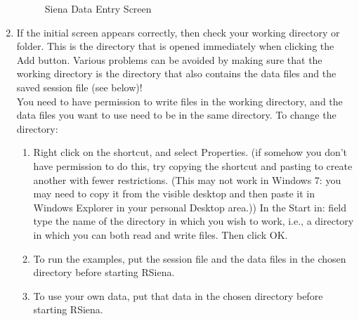 \documentclass[a4paper,fleqn,11pt]{article}
\newcommand{\+}{\, + \,}
\newcommand{\rs}{{\sf RSiena}}
\begin{document}
\begin{enumerate}
\begin{figure}[ht]
\begin{center}
\hypertarget{siena1}{}
    \end{center}
\caption{Siena Data Entry Screen}
\label{fig:siena1}
  \end{figure}
\item If the initial screen appears correctly, then check your working directory
  or folder. This is the directory that is opened immediately when clicking the
  \textsf{Add} button.  Various problems can be avoided by making sure that the
  working directory is the directory that also contains the data files and the
  saved session file
  (see below)!\\
  You need to have permission to write files in the working directory, and the
  data files you want to use need to be in the same directory. To change the
  directory:
\begin{enumerate}
\item Right click on the shortcut, and select Properties. (if somehow you don't
  have permission to do this, try copying the shortcut and pasting to create
  another with fewer restrictions. (This may not work in Windows 7: you may need
  to copy it from the visible desktop and then paste it in Windows Explorer in
  your personal Desktop area.))  In the \textsf{Start in:} field type the name
  of the directory in which you wish to work, i.e., a directory in which you can
  both read and write files. Then click OK.

\item To run the examples, put the session file and the data files in
the chosen directory before starting \rs.

\item To use your own data, put that data in the chosen directory before
starting \rs.
\end{enumerate}
\end{enumerate}
\end{document}
